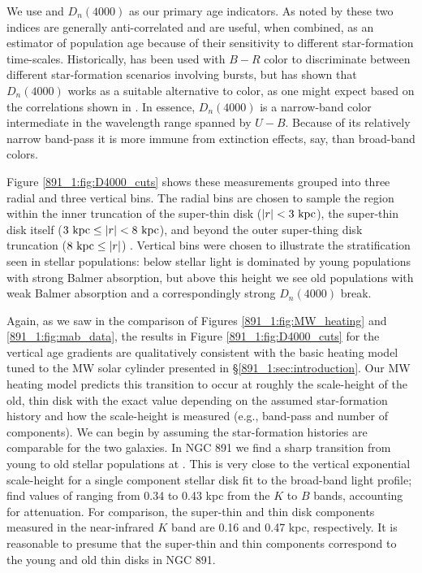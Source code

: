 We use \Hda and $D_n(4000)$ as our primary age indicators. As noted by
\citet{Hamilton85} these two indices are generally anti-correlated and
are useful, when combined, as an estimator of population age because
of their sensitivity to different star-formation time-scales.
Historically, \Hda has been used with $B-R$ color
\citep[e.g.,][]{Couch87} to discriminate between different
star-formation scenarios involving bursts, but \citet{Balogh99} has
shown that $D_n(4000)$ works as a suitable alternative to color, as
one might expect based on the correlations shown in
\citet{Hamilton85}. In essence, $D_n(4000)$ is a narrow-band color
intermediate in the wavelength range spanned by $U-B$. Because of its
relatively narrow band-pass it is more immune from extinction effects,
say, than broad-band colors.

Figure \ref{891_1:fig:D4000_cuts} shows these measurements grouped into
three radial and three vertical bins. The radial bins are chosen to
sample the region within the inner truncation of the super-thin disk
($|r| < 3~\mathrm{kpc} $), the super-thin disk itself ($3~\mathrm{kpc} \leq
|r| < 8~\mathrm{kpc} $), and beyond the outer super-thing disk truncation
($8~\mathrm{kpc}  \leq |r|$) \citep{Schechtman-Rook13}. Vertical bins
were chosen to illustrate the stratification seen in stellar
populations: below  stellar light is dominated by young
populations with strong Balmer absorption, but above this height we
see old populations with weak Balmer absorption and a correspondingly
strong $D_n(4000)$ break.

Again, as we saw in the comparison of Figures
\ref{891_1:fig:MW_heating} and \ref{891_1:fig:mab_data}, the results
in Figure \ref{891_1:fig:D4000_cuts} for the vertical age gradients
are qualitatively consistent with the basic heating model tuned to the
MW solar cylinder presented in \S\ref{891_1:sec:introduction}. Our MW
heating model predicts this transition to occur at roughly the
scale-height of the old, thin disk with the exact value depending on
the assumed star-formation history and how the scale-height is
measured (e.g., band-pass and number of components). We can begin by
assuming the star-formation histories are comparable for the two
galaxies. In NGC 891 we find a sharp transition from young to old
stellar populations at . This is very close to the
vertical exponential scale-height for a single component stellar disk
fit to the broad-band light profile; \citet{Xilouris99} find values of
ranging from 0.34 to 0.43 kpc from the $K$ to $B$ bands, accounting
for attenuation. For comparison, the super-thin and thin disk
components measured in the near-infrared $K$ \citep{Schechtman-Rook13}
band are 0.16 and 0.47 kpc, respectively. It is reasonable to presume
that the super-thin and thin components correspond to the young and
old thin disks in NGC 891.

